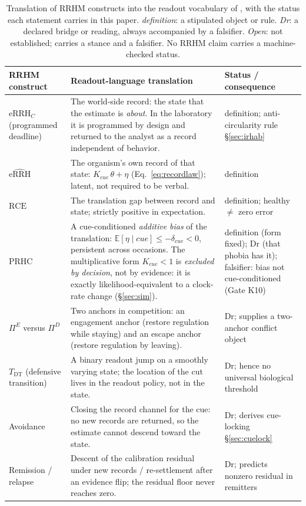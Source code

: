 \documentclass[9pt,twocolumn]{article}
\newcommand{\eRRHc}{\mathrm{eRRH}_{C}}
\newcommand{\eRRHhat}{\widehat{\mathrm{eRRH}}}
\newcommand{\RCE}{\mathrm{RCE}}
\newcommand{\PRHC}{\mathrm{PRHC}}
\newcommand{\Tdt}{T_{\mathrm{DT}}}
\begin{document}
\begin{table}[!t]
\centering
\caption{Translation of RRHM constructs into the readout vocabulary of \cite{lahtee2026ru}, with the status each statement carries in this paper. \emph{definition}: a stipulated object or rule. \emph{Dr}: a declared bridge or reading, always accompanied by a falsifier. \emph{Open}: not established; carries a stance and a falsifier. No RRHM claim carries a machine-checked status.}
\label{tab:translation}
\small
\begin{tabularx}{\textwidth}{p{}X p{}}
\toprule
\textbf{RRHM construct} & \textbf{Readout-language translation} & \textbf{Status / consequence} \\
\midrule
$\eRRHc$ (programmed deadline) & The world-side record: the state that the estimate is \emph{about}. In the laboratory it is programmed by design and returned to the analyst as a record independent of behavior. & definition; anti-circularity rule \S\ref{sec:irhab} \\
$\eRRHhat$ & The organism's own record of that state: $K_{cue}\,\theta+\eta$ (Eq.~\ref{eq:recordlaw}); latent, not required to be verbal. & definition \\
$\RCE$ & The translation gap between record and state; strictly positive in expectation. & definition; healthy $\neq$ zero error \\
$\PRHC$ & A cue-conditioned \emph{additive bias} of the translation: $\mathbb{E}[\eta\mid cue]\le-\delta_{cue}<0$, persistent across occasions. The multiplicative form $K_{cue}<1$ is \emph{excluded by decision}, not by evidence: it is exactly likelihood-equivalent to a clock-rate change (\S\ref{sec:sim}). & definition (form fixed); Dr (that phobia has it); falsifier: bias not cue-conditioned (Gate K10) \\
$\Pi^E$ versus $\Pi^D$ & Two anchors in competition: an engagement anchor (restore regulation while staying) and an escape anchor (restore regulation by leaving). & Dr; supplies a two-anchor conflict object \\
$\Tdt$ (defensive transition) & A binary readout jump on a smoothly varying state; the location of the cut lives in the readout policy, not in the state. & Dr; hence no universal biological threshold \\
Avoidance & Closing the record channel for the cue: no new records are returned, so the estimate cannot descend toward the state. & Dr; derives cue-locking \S\ref{sec:cuelock} \\
Remission / relapse & Descent of the calibration residual under new records / re-settlement after an evidence flip; the residual floor never reaches zero. & Dr; predicts nonzero residual in remitters \\

\end{tabularx}
\end{table}
\end{document}
